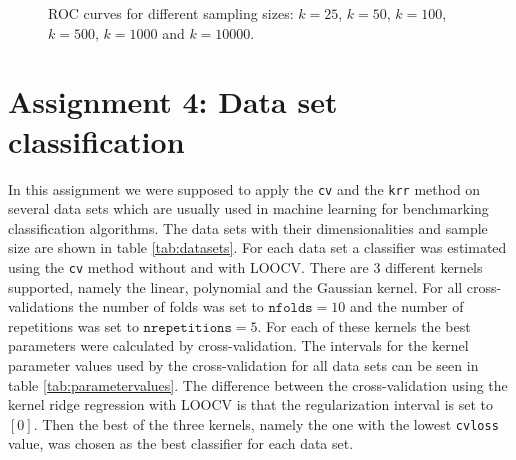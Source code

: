 \documentclass[a4paper, 11pt, titlepage]{article}
\begin{document}
\begin{figure}
	\caption{ROC curves for different sampling sizes: \protect{} $k=25$, \protect{} $k=50$, \protect{} $k=100$, \protect{} $k=500$, \protect{} $k=1000$ and \protect{} $k=10000$.}
	\label{fig:rocCurves}
\end{figure}

\section*{Assignment 4: Data set classification}

In this assignment we were supposed to apply the \texttt{cv} and the \texttt{krr} method on several data sets which are usually used in machine learning for benchmarking classification algorithms.
The data sets with their dimensionalities and sample size are shown in table \ref{tab:datasets}.
For each data set a classifier was estimated using the \texttt{cv} method without and with LOOCV.
There are $3$ different kernels supported, namely the linear, polynomial and the Gaussian kernel.
For all cross-validations the number of folds was set to $\texttt{nfolds}=10$ and the number of repetitions was set to $\texttt{nrepetitions}=5$.
For each of these kernels the best parameters were calculated by cross-validation.
The intervals for the kernel parameter values used by the cross-validation for all data sets can be seen in table \ref{tab:parametervalues}.
The difference between the cross-validation using the kernel ridge regression with LOOCV is that the regularization interval is set to $[0]$.
Then the best of the three kernels, namely the one with the lowest \texttt{cvloss} value, was chosen as the best classifier for each data set.
\end{document}
